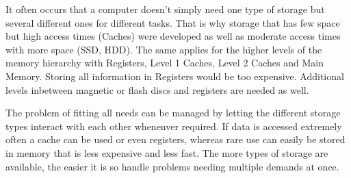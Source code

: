 It often occurs that a computer doesn't simply need one type of storage but several different ones for different tasks. That is why storage that has few space but high access times (Caches) were developed as well as moderate access times with more space (SSD, HDD). The same applies for the higher levels of the memory hierarchy with Registers, Level 1 Caches, Level 2 Caches and Main Memory. Storing all information in Registers would be too expensive. Additional levels inbetween magnetic or flash discs and registers are needed as well.

The problem of fitting all needs can be managed by letting the different storage types interact with each other whenenver required. If data is accessed extremely often a cache can be used or even registers, whereas rare use can easily be stored in memory that is less expensive and less fast. The more types of storage are available, the easier it is so handle problems needing multiple demands at once.



